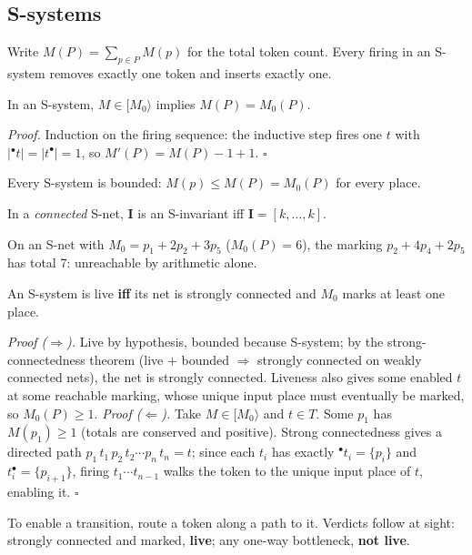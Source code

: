 \subsection{S-systems}

Write $M(P) = \sum_{p \in P} M(p)$ for the total token count. Every firing in an S-system removes exactly one token and inserts exactly one.

\begin{proposition}
In an S-system, $M \in [M_0\rangle$ implies $M(P) = M_0(P)$.
\end{proposition}
\textit{Proof.} Induction on the firing sequence: the inductive step fires one $t$ with $|{}^\bullet t| = |t^\bullet| = 1$, so $M'(P) = M(P) - 1 + 1$. \hfill$\square$

\begin{corollary}
Every S-system is bounded: $M(p) \leq M(P) = M_0(P)$ for every place.
\end{corollary}

\begin{proposition}
In a \emph{connected} S-net, $\mathbf{I}$ is an S-invariant iff $\mathbf{I} = [k, \ldots, k]$.
\end{proposition}

On an S-net with $M_0 = p_1 + 2p_2 + 3p_5$ ($M_0(P) = 6$), the marking $p_2 + 4p_4 + 2p_5$ has total 7: unreachable by arithmetic alone.

\begin{theorem}
An S-system is live \textbf{iff} its net is strongly connected and $M_0$ marks at least one place.
\end{theorem}
\textit{Proof ($\Rightarrow$).} Live by hypothesis, bounded because S-system; by the strong-connectedness theorem (live $+$ bounded $\Rightarrow$ strongly connected on weakly connected nets), the net is strongly connected. Liveness also gives some enabled $t$ at some reachable marking, whose unique input place must eventually be marked, so $M_0(P) \geq 1$.
\textit{Proof ($\Leftarrow$).} Take $M \in [M_0\rangle$ and $t \in T$. Some $p_1$ has $M(p_1) \geq 1$ (totals are conserved and positive). Strong connectedness gives a directed path $p_1\, t_1\, p_2\, t_2 \cdots p_n\, t_n = t$; since each $t_i$ has exactly ${}^\bullet t_i = \{p_i\}$ and $t_i^\bullet = \{p_{i+1}\}$, firing $t_1 \cdots t_{n-1}$ walks the token to the unique input place of $t$, enabling it. \hfill$\square$

To enable a transition, route a token along a path to it. Verdicts follow at sight: strongly connected and marked, \textbf{live}; any one-way bottleneck, \textbf{not live}.

